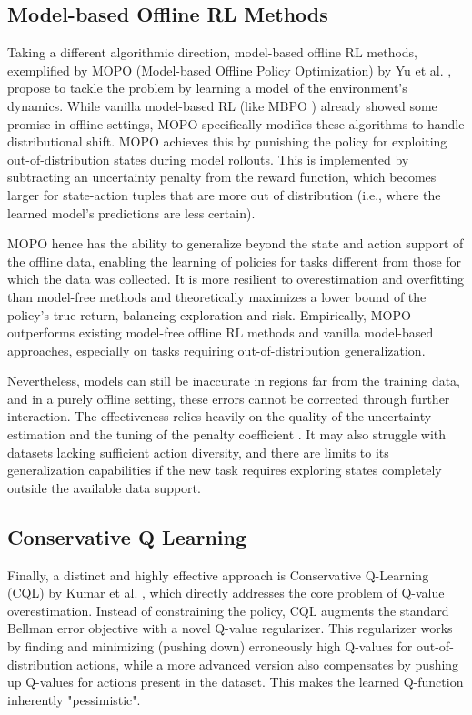 \subsection{Model-based Offline RL Methods}
\label{sec:mopo}
Taking a different algorithmic direction, model-based offline RL methods, exemplified by MOPO (Model-based Offline Policy Optimization) by Yu et al. \cite{yuMOPOModelbasedOffline2020}, propose to tackle the problem by learning a model of the environment's dynamics. While vanilla model-based RL (like MBPO \cite{jannerWhenTrustYour2021}) already showed some promise in offline settings, MOPO specifically modifies these algorithms to handle distributional shift. MOPO achieves this by punishing the policy for exploiting out-of-distribution states during model rollouts. This is implemented by subtracting an uncertainty penalty from the reward function, which becomes larger for state-action tuples that are more out of distribution (i.e., where the learned model's predictions are less certain).

MOPO hence has the ability to generalize beyond the state and action support of the offline data, enabling the learning of policies for tasks different from those for which the data was collected. It is more resilient to overestimation and overfitting than model-free methods and theoretically maximizes a lower bound of the policy's true return, balancing exploration and risk. Empirically, MOPO outperforms existing model-free offline RL methods and vanilla model-based approaches, especially on tasks requiring out-of-distribution generalization.

Nevertheless, models can still be inaccurate in regions far from the training data, and in a purely offline setting, these errors cannot be corrected through further interaction. The effectiveness relies heavily on the quality of the uncertainty estimation and the tuning of the penalty coefficient \cite{levineOfflineReinforcementLearning2020}. It may also struggle with datasets lacking sufficient action diversity, and there are limits to its generalization capabilities if the new task requires exploring states completely outside the available data support.


\subsection{Conservative Q Learning}
Finally, a distinct and highly effective approach is Conservative Q-Learning (CQL) by Kumar et al. \cite{kumarConservativeQLearningOffline2020}, which directly addresses the core problem of Q-value overestimation. Instead of constraining the policy, CQL augments the standard Bellman error objective with a novel Q-value regularizer. This regularizer works by finding and minimizing (pushing down) erroneously high Q-values for out-of-distribution actions, while a more advanced version also compensates by pushing up Q-values for actions present in the dataset. This makes the learned Q-function inherently "pessimistic".

